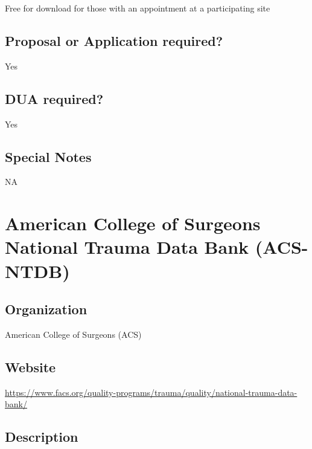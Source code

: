 \documentclass[
]{book}
\begin{document}
Free for download for those with an appointment at a participating site

\hypertarget{proposal-or-application-required-3}{%
\section{Proposal or Application required?}\label{proposal-or-application-required-3}}

Yes

\hypertarget{dua-required-3}{%
\section{DUA required?}\label{dua-required-3}}

Yes

\hypertarget{special-notes-3}{%
\section{Special Notes}\label{special-notes-3}}

NA

\mainmatter

\hypertarget{american-college-of-surgeons-national-trauma-data-bank-acs-ntdb}{%
\chapter{American College of Surgeons National Trauma Data Bank (ACS-NTDB)}\label{american-college-of-surgeons-national-trauma-data-bank-acs-ntdb}}

\hypertarget{organization-4}{%
\section{Organization}\label{organization-4}}

American College of Surgeons (ACS)

\hypertarget{website-4}{%
\section{Website}\label{website-4}}

\url{https://www.facs.org/quality-programs/trauma/quality/national-trauma-data-bank/}

\hypertarget{description-4}{%
\section{Description}\label{description-4}}
\end{document}
